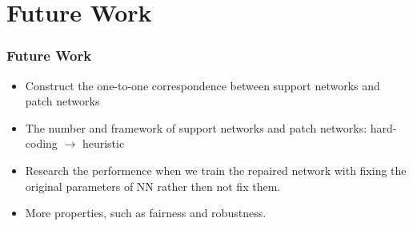 \documentclass[aspectratio=169%
,serif,mathserif]{beamer}
\begin{document}
\section{Future Work}
\begin{frame}
	\frametitle{Future Work}
	\begin{itemize}
		\item Construct the one-to-one correspondence between support networks and patch networks
		\item The number and framework of support networks and patch networks: hard-coding $\to$ heuristic
		\item Research the performence when we train the repaired network with fixing the original parameters of NN rather then not fix them.
		\item More properties, such as fairness and robustness.
	\end{itemize}
\end{frame}






\begin{frame}
\hfill
{}
\linespread{3}\selectfont
\end{frame}
\end{document}
